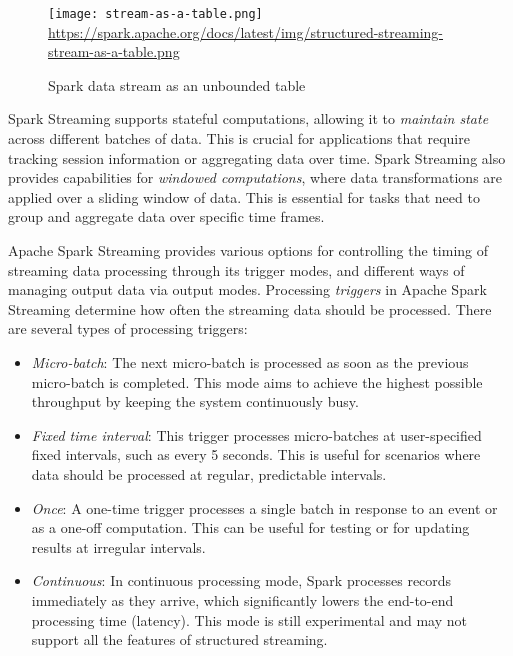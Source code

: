 \begin{figure}
\centering

\texttt{[image: stream-as-a-table.png]} \\

\scriptsize\url{https://spark.apache.org/docs/latest/img/structured-streaming-stream-as-a-table.png}
\caption{Spark data stream as an unbounded table}
\label{fig:sparkstreamtable}
\end{figure}

Spark Streaming supports stateful computations, allowing it to \emph{maintain state} across different batches of data. This is crucial for applications that require tracking session information or aggregating data over time. Spark Streaming also provides capabilities for \emph{windowed computations}, where data transformations are applied over a sliding window of data. This is essential for tasks that need to group and aggregate data over specific time frames.

Apache Spark Streaming provides various options for controlling the timing of streaming data processing through its trigger modes, and different ways of managing output data via output modes. Processing \emph{triggers} in Apache Spark Streaming determine how often the streaming data should be processed. There are several types of processing triggers:

\begin{itemize}
\item \emph{Micro-batch}: The next micro-batch is processed as soon as the previous micro-batch is completed. This mode aims to achieve the highest possible throughput by keeping the system continuously busy.

\item \emph{Fixed time interval}: This trigger processes micro-batches at user-specified fixed intervals, such as every 5 seconds. This is useful for scenarios where data should be processed at regular, predictable intervals.

\item \emph{Once}: A one-time trigger processes a single batch in response to an event or as a one-off computation. This can be useful for testing or for updating results at irregular intervals.

\item \emph{Continuous}: In continuous processing mode, Spark processes records immediately as they arrive, which significantly lowers the end-to-end processing time (latency). This mode is still experimental and may not support all the features of structured streaming.
\end{itemize}


